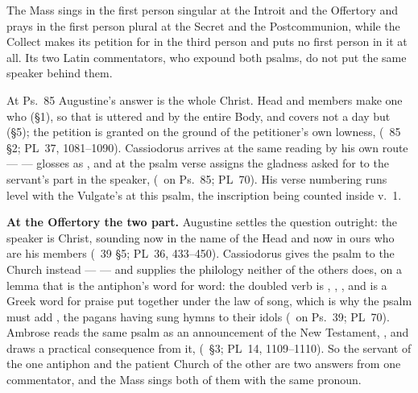 The Mass sings in the first person singular at the Introit and the Offertory
and prays in the first person plural at the Secret and the Postcommunion,
while the Collect makes its petition for  in the third
person and puts no first person in it at all. Its two Latin commentators, who
expound both psalms, do not put the same speaker behind them.

At Ps.~85 Augustine's answer is the whole Christ. Head and members make one
who  (§1), so that
 is uttered  and by
the entire Body, and  covers not a day but  (§5); the petition is
granted on the ground of the petitioner's own lowness,  (~85 §2; PL~37, 1081--1090). Cassiodorus arrives at
the same reading by his own route ---  --- glosses
 as , and at the psalm verse
assigns the gladness asked for to the servant's part in the speaker,  (\ on Ps.~85; PL~70). His verse numbering
runs level with the Vulgate's at this psalm, the inscription being counted
inside v.~1.

\textbf{At the Offertory the two part.} Augustine settles the question
outright: the speaker is Christ, sounding now in the name of the Head and now
in ours who are his members (~39 §5; PL~36, 433--450).
Cassiodorus gives the psalm to the Church instead ---  --- and supplies the philology neither of the others does,
on a lemma that is the antiphon's word for word: the doubled verb is
,
, , and  is a Greek word for
praise put together under the law of song, which is why the psalm must add
, the pagans having sung hymns to their idols (\ on
Ps.~39; PL~70). Ambrose reads the same psalm as an announcement of the New
Testament, , and draws a practical consequence from it, 
(~§3; PL~14, 1109--1110). So the servant of the one antiphon and the
patient Church of the other are two answers from one commentator, and the Mass
sings both of them with the same pronoun.

